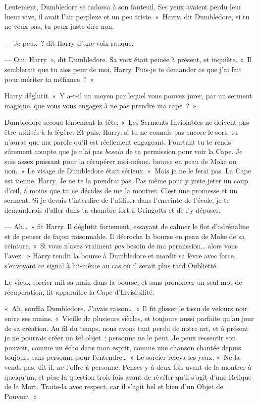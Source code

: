Lentement, Dumbledore se radossa à son fauteuil.
Ses yeux avaient perdu leur lueur vive, il avait l'air perplexe et un peu triste.
«~Harry, dit Dumbledore, si tu ne veux pas, tu peux juste dire non.

--- Je peux~? dit Harry d'une voix rauque.

--- Oui, Harry~», dit Dumbledore.
Sa voix était peinée à présent, et inquiète.
«~Il semblerait que tu aies peur de moi, Harry.
Puis-je te demander ce que j'ai fait pour mériter ta méfiance~?~»

Harry déglutit.
«~Y a-t-il un moyen par lequel vous pouvez jurer, par un serment magique, que vous vous engagez à ne pas prendre ma cape~?~»

Dumbledore secoua lentement la tête.
«~Les Serments Inviolables ne doivent pas être utilisés à la légère.
Et puis, Harry, si tu ne connais pas encore le sort, tu n'auras que ma parole qu'il est réellement engageant.
Pourtant tu te rends sûrement compte que je n'ai pas \emph{besoin} de ta permission pour voir la Cape.
Je suis assez puissant pour la récupérer moi-même, bourse en peau de Moke ou non.~»
Le visage de Dumbledore était sérieux.
«~Mais je ne le ferai pas.
La Cape est tienne, Harry.
Je ne te la prendrai pas.
Pas même pour y juste jeter un coup d'œil, à moins que tu ne décides de me la montrer.
C'est une promesse et un serment.
Si je devais t'interdire de l'utiliser dans l'enceinte de l'école, je te demanderais d'aller dans ta chambre fort à Gringotts et de l'y déposer.

--- Ah…~» fit Harry.
Il déglutit fortement, essayant de calmer le flot d'adrénaline et de penser de façon raisonnable.
Il décrocha la bourse en peau de Moke de sa ceinture.
«~Si vous n'avez vraiment \emph{pas} besoin de ma permission… alors vous l'avez.~»
Harry tendit la bourse à Dumbledore et mordit sa lèvre avec force, s'envoyant ce signal à lui-même au cas où il serait plus tard Oublietté.

Le vieux sorcier mit sa main dans la bourse, et sans prononcer un seul mot de récupération, fit apparaître la Cape d'Invisibilité.

«~Ah, souffla Dumbledore.
J'avais raison…~»
Il fit glisser le tissu de velours noir entre ses mains.
«~Vieille de plusieurs siècles, et toujours aussi parfaite qu'au jour de sa création.
Au fil du temps, nous avons tant perdu de notre art, et à présent je ne pourrais créer un tel objet~; personne ne le peut.
Je peux ressentir son pouvoir, comme un écho dans mon esprit, comme une chanson chantée depuis toujours sans personne pour l'entendre…~»
Le sorcier releva les yeux.
«~Ne la vends pas, dit-il, ne l'offre à personne.
Penses-y à deux fois avant de la montrer à quelqu'un, et pèse la question trois fois avant de révéler qu'il s'agit d'une Relique de la Mort.
Traite-la avec respect, car il s'agit bel et bien d'un Objet de Pouvoir.~»

